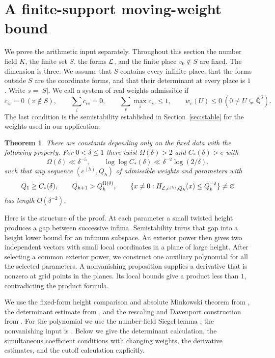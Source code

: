 \documentclass[11pt]{article}
\numberwithin{equation}{section}
\newtheorem{theorem}{Theorem}[section]
\theoremstyle{remark}\newtheorem{remark}[theorem]{Remark}
\newcommand{\Qbar}{\overline{\mathbb Q}}
\begin{document}
\section{A finite-support moving-weight bound}\label{sec:moving}
We prove the arithmetic input separately. Throughout this section the
number field $K$, the finite set $S$, the forms $\mathcal L$, and the finite
place $v_0\notin S$ are fixed. The dimension is three. We assume that
$S$ contains every infinite place, that the forms outside $S$ are the
coordinate forms, and that their determinant at every place is $1$.
Write $s=|S|$. We call a system of real weights admissible if
\begin{equation}\label{eq:admissible}
 c_{iv}=0\ (v\notin S),\qquad
 \sum_i c_{iv}=0,\qquad \sum_v\max_i c_{iv}\le1,
 \qquad w_c(U)\le0\ (0\ne U\subsetneq\Qbar^3).
\end{equation}
The last condition is the semistability established in
Section~\ref{sec:stable} for the weights used in our application.

\begin{theorem}\label{thm:sparse}
There are constants depending only on the fixed data with the following
property. For $0<\delta\le1$ there exist $\Omega(\delta)>2$ and
$C_*(\delta)>e$ with
\begin{equation}\label{eq:cutofforder}
 \Omega(\delta)\ll\delta^{-5},\qquad
 \log\log C_*(\delta)\ll\delta^{-2}\log(2/\delta),
\end{equation}
such that any sequence $(c^{(h)},Q_h)$ of admissible weights and parameters
with
\[
 Q_1\ge C_*(\delta),\qquad Q_{h+1}>Q_h^{\Omega(\delta)},\qquad
 \{x\ne0:H_{\mathcal L,c^{(h)},Q_h}(x)\le Q_h^{-\delta}\}\ne\varnothing
\]
has length $O(\delta^{-2})$.
\end{theorem}

Here is the structure of the proof. At each parameter a small twisted
height produces a gap between successive infima. Semistability turns
that gap into a height lower bound for an infimum subspace. An exterior
power then gives two independent vectors with small local coordinates
in a plane of large height. After selecting a common exterior power,
we construct one auxiliary polynomial for all the selected parameters.
A nonvanishing proposition supplies a derivative that is nonzero at
grid points in the planes. Its local bounds give a product less than
$1$, contradicting the product formula.

We use the fixed-form height comparison and absolute Minkowski theorem
from \cite[Lemma~7.1 and Proposition~9.2]{EF13}, the determinant estimate
from \cite[Lemma~10.2]{EF13}, and the rescaling and Davenport construction
from \cite[Lemmas~11.1--11.3]{EF13}. For the polynomial we use the
number-field Siegel lemma \cite[Lemma~13.1]{EF13}; the nonvanishing input
is \cite[Proposition~12.1]{EF13}. Below we give the determinant
calculation, the simultaneous coefficient conditions with changing
weights, the derivative estimates, and the cutoff calculation explicitly.
\end{document}
